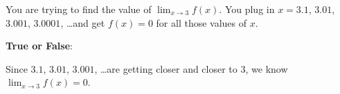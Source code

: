 \documentclass{ximera}
\author{Bobby Ramsey}
\begin{document}
\begin{exercise}

	You are trying to find the value of $\displaystyle \lim_{x\to 3} f(x)$.  You plug in $x=3.1$, $3.01$, $3.001$, $3.0001$, \ldots and get $f(x) =0$ for all those values of $x$.
	
	\textbf{True or False}:
	
		Since $3.1$, $3.01$, $3.001$, \ldots are getting closer and closer to $3$, we know $\displaystyle \lim_{x\to3} f(x) = 0$.
		\begin{multipleChoice}
		\end{multipleChoice}	
\end{exercise}
\end{document}
